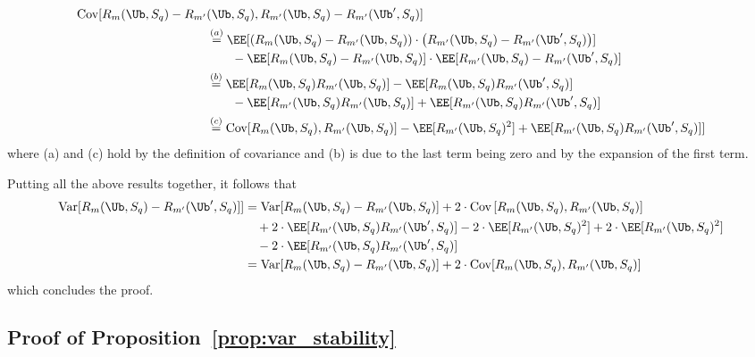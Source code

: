\begin{align*}
    \Cov[R_m(\Ub,S_q)-R_{m'}&(\Ub,S_q), R_{m'}(\Ub,S_q)-R_{m'}(\Ub',S_q)]\nonumber
    \\ %
    &\overset{(a)}{=} \EE[\left(R_m(\Ub,S_q)-R_{m'}(\Ub,S_q)\right) \cdot \left( R_{m'}(\Ub,S_q)-R_{m'}(\Ub',S_q) \right)] 
    \\ &\quad \quad - \EE[R_m(\Ub,S_q)-R_{m'}(\Ub,S_q)]\cdot \EE[R_{m'}(\Ub,S_q)-R_{m'}(\Ub',S_q)]
    \\ %
    &\overset{(b)}{=} \EE[R_m(\Ub,S_q)R_{m'}(\Ub,S_q)] - \EE[R_m(\Ub,S_q)R_{m'}(\Ub',S_q)]
    \\ &\quad \quad - \EE[R_{m'}(\Ub,S_q)R_{m'}(\Ub,S_q)] + \EE[R_{m'}(\Ub,S_q)R_{m'}(\Ub',S_q)] 
    \\ %
    & \overset{(c)}{=} \Cov[R_m(\Ub,S_q),R_{m'}(\Ub,S_q)] - \EE[R_{m'}(\Ub,S_q)^2] + \EE[R_{m'}(\Ub,S_q)R_{m'}(\Ub',S_q)]] %
\end{align*}
\endgroup
where (a) and (c) hold by the definition of covariance and (b) is due to the last term being zero and by the expansion of the first term.

Putting all the above results together, it follows that
%
\begin{align*}
    \Var[R_m(\Ub,S_q)-R_{m'}(\Ub',S_q)] ]
        & = \Var[R_m(\Ub,S_q)-R_{m'}(\Ub,S_q)] 
        + 2\cdot \Cov\left[R_m(\Ub,S_q),R_{m'}(\Ub,S_q)\right] \\
         & \quad+ 2\cdot \EE[R_{m'}(\Ub,S_q)R_{m'}(\Ub',S_q)] 
         - 2\cdot \EE[R_{m'}(\Ub,S_q)^2] 
         + 2 \cdot \EE[R_{m'}(\Ub,S_q)^2] \\
         & \quad - 2 \cdot \EE[R_{m'}(\Ub,S_q)R_{m'}(\Ub',S_q)]
        \\&= \Var[R_m(\Ub,S_q)-R_{m'}(\Ub,S_q)] 
        + 2\cdot \Cov[R_m(\Ub,S_q),R_{m'}(\Ub,S_q)] 
\end{align*}
which concludes the proof.


\subsection{Proof of Proposition~\ref{prop:var_stability}}

